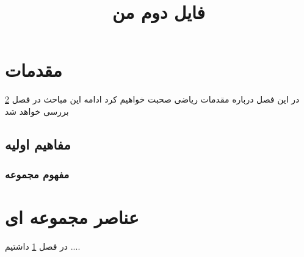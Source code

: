 \documentclass{book}
\title{فایل دوم من}
\begin{document}
\maketitle
\chapter{مقدمات}\label{chap1}
در این فصل درباره مقدمات ریاضی صحبت خواهیم کرد
ادامه این مباحث در فصل \ref{chap2} بررسی خواهد شد
\section{مفاهیم اولیه}\label{chap1sec1}
\subsection{مفهوم مجموعه}\label{chap1sec1sub1}
 

\chapter{عناصر مجموعه ای}\label{chap2}
در فصل \ref{chap1}	داشتیم ....
	
	
\end{document}
